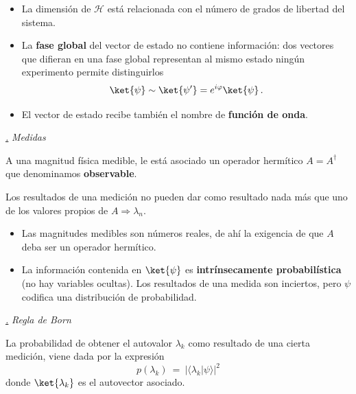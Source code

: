 \documentclass[a4paper,11pt]{book} %
\numberwithin{equation}{chapter}
\newcommand{\braket}[2]{\langle #1|#2\rangle}
\def\subsubiContadorIt{\par\addtocounter{subsubsection}{1}\underline{\it\thesubsubsection.}\hskip0.5cm \setcounter{subsubsubsectionIt}{0}}
\newcommand{\SubsubiIt}[1]{
		\subsubiContadorIt \textit{#1}
	}
\newcounter{subsubsubsectionIt}[subsubsection]
\begin{document}
\begin{itemize}
	\item La dimensión de $\mathcal{H}$ está relacionada con el número de grados de libertad del sistema.

	\item La \textbf{fase global} del vector de estado no contiene información: dos vectores que difieran en una fase global representan al mismo estado ningún experimento permite distinguirlos
	\begin{equation}
	\ket{\psi} \sim \ket{\psi'} =  e^{i\varphi}\ket{\psi} \, .
	\end{equation}

	\item El vector de estado recibe también el nombre de \textbf{función de onda}.
\end{itemize}
		\SubsubiIt{Medidas}

\begin{mybox_gray2}{}
A una magnitud física medible, le está asociado   un operador hermítico  $ A= A^\dagger$ que denominamos \textbf{observable}.
\end{mybox_gray2}

\begin{mybox_gray2}{}
Los resultados de una medición no pueden dar como resultado nada más que uno de los valores propios de $A \Rightarrow \lambda_n$.
\end{mybox_gray2}

\begin{itemize}
	\item Las magnitudes medibles son números reales, de ahí la exigencia de que $A$ deba ser un operador hermítico.
	
	\item La información contenida en $\ket{\psi}$ es \textbf{intrínsecamente probabilística} (no hay variables ocultas). Los resultados de una medida son inciertos, pero $\psi$ codifica una distribución de probabilidad. 
\end{itemize}




		\SubsubiIt{Regla de Born}

\begin{mybox_gray2}{}
La probabilidad de obtener  el autovalor $\lambda_k$ como resultado de una cierta medición, viene dada por la expresión
	\begin{equation}
	p(\lambda_k)~ = ~|\braket{\lambda_k}{\psi}|^2
	\end{equation}
donde $\ket{\lambda_k}$ es el autovector asociado. 
\end{mybox_gray2}
\end{document}
